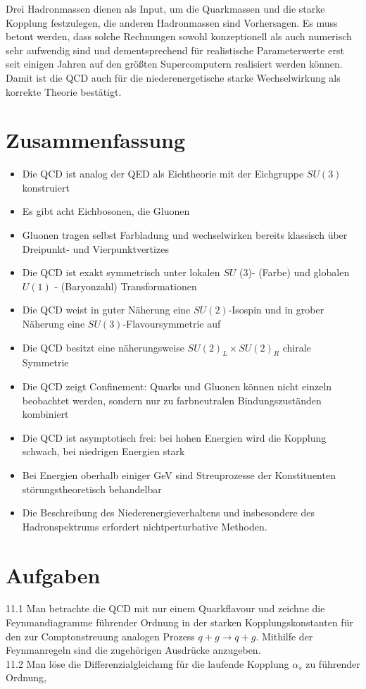 \documentclass[10pt, letterpaper]{article}
\begin{document}
Drei Hadronmassen dienen als Input, um die Quarkmassen und die starke Kopplung festzulegen, die anderen Hadronmassen sind Vorhersagen. Es muss betont werden, dass solche Rechnungen sowohl konzeptionell als auch numerisch sehr aufwendig sind und dementsprechend für realistische Parameterwerte erst seit einigen Jahren auf den größten Supercomputern realisiert werden können. Damit ist die QCD auch für die niederenergetische starke Wechselwirkung als korrekte Theorie bestätigt.

\section*{Zusammenfassung}
\begin{itemize}
  \item Die QCD ist analog der QED als Eichtheorie mit der Eichgruppe $S U(3)$ konstruiert
  \item Es gibt acht Eichbosonen, die Gluonen
  \item Gluonen tragen selbst Farbladung und wechselwirken bereits klassisch über Dreipunkt- und Vierpunktvertizes
  \item Die QCD ist exakt symmetrisch unter lokalen $S U$ (3)- (Farbe) und globalen $U(1)$ - (Baryonzahl) Transformationen
  \item Die QCD weist in guter Näherung eine $S U(2)$-Isospin und in grober Näherung eine $S U(3)$-Flavoursymmetrie auf
  \item Die QCD besitzt eine näherungsweise $S U(2)_{L} \times S U(2)_{R}$ chirale Symmetrie
  \item Die QCD zeigt Confinement: Quarks und Gluonen können nicht einzeln beobachtet werden, sondern nur zu farbneutralen Bindungszuständen kombiniert
  \item Die QCD ist asymptotisch frei: bei hohen Energien wird die Kopplung schwach, bei niedrigen Energien stark
  \item Bei Energien oberhalb einiger GeV sind Streuprozesse der Konstituenten störungstheoretisch behandelbar
  \item Die Beschreibung des Niederenergieverhaltens und insbesondere des Hadronspektrums erfordert nichtperturbative Methoden.
\end{itemize}

\section*{Aufgaben}
11.1 Man betrachte die QCD mit nur einem Quarkflavour und zeichne die Feynmandiagramme führender Ordnung in der starken Kopplungskonstanten für den zur Comptonstreuung analogen Prozess $q+g \longrightarrow q+g$. Mithilfe der Feynmanregeln sind die zugehörigen Ausdrücke anzugeben.\\
11.2 Man löse die Differenzialgleichung für die laufende Kopplung $\alpha_{s}$ zu führender Ordnung,
\end{document}

